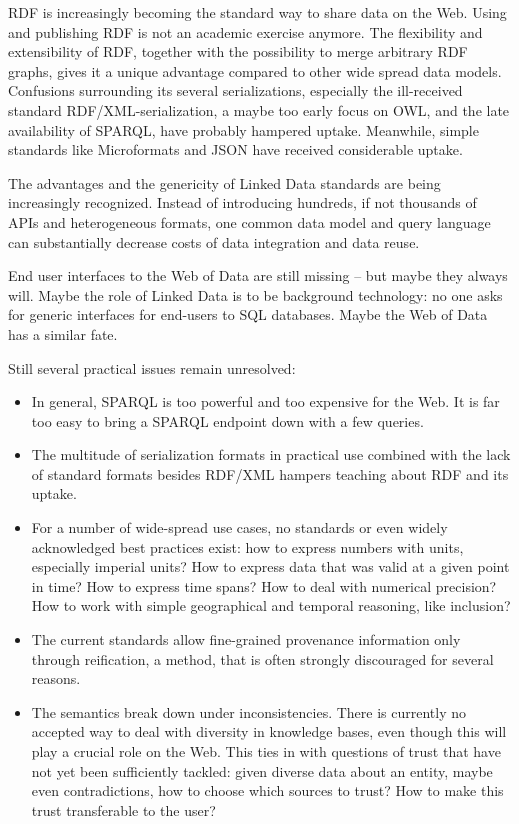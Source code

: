 RDF is increasingly becoming the standard way to share data on the Web.
Using and publishing RDF is not an academic exercise anymore.
The flexibility and extensibility of RDF, together with the possibility to merge arbitrary RDF graphs, gives it a unique advantage compared to other wide spread data models.
Confusions surrounding its several serializations, especially the ill-received standard RDF/XML-serialization, a maybe too early focus on OWL, and the late availability of SPARQL, have probably hampered uptake.
Meanwhile, simple standards like Microformats and JSON have received considerable uptake.

The advantages and the genericity of Linked Data standards are being increasingly recognized.
Instead of introducing hundreds, if not thousands of APIs and heterogeneous formats, one common data model and query language can substantially decrease costs of data integration and data reuse.

End user interfaces to the Web of Data are still missing -- but maybe they always will.
Maybe the role of Linked Data is to be background technology:
no one asks for generic interfaces for end-users to SQL databases.
Maybe the Web of Data has a similar fate.

Still several practical issues remain unresolved:
\begin{itemize}
\item In general, SPARQL is too powerful and too expensive for the Web. It is far too easy to bring a SPARQL endpoint down with a few queries.
\item The multitude of serialization formats in practical use combined with the lack of standard formats besides RDF/XML hampers teaching about RDF and its uptake.
\item For a number of wide-spread use cases, no standards or even widely acknowledged best practices exist: how to express numbers with units, especially imperial units? How to express data that was valid at a given point in time? How to express time spans? How to deal with numerical precision? How to work with simple geographical and temporal reasoning, like inclusion?
\item The current standards allow fine-grained provenance information only through reification, a method, that is often strongly discouraged for several reasons.
\item The semantics break down under inconsistencies. There is currently no accepted way to deal with diversity in knowledge bases, even though this will play a crucial role on the Web. This ties in with questions of trust that have not yet been sufficiently tackled: given diverse data about an entity, maybe even contradictions, how to choose which sources to trust? How to make this trust transferable to the user?
\end{itemize}


